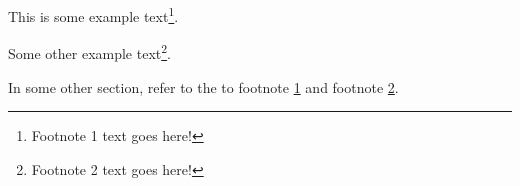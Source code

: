 \documentclass{article}
\begin{document}
This is some example text\footnote{\label{footnote1}Footnote 1 text goes here!}.

Some other example text\footnote{\label{footnote2}Footnote 2 text goes here!}.

In some other section, refer to the to footnote \ref{footnote1} and footnote \ref{footnote2}.
\end{document}
